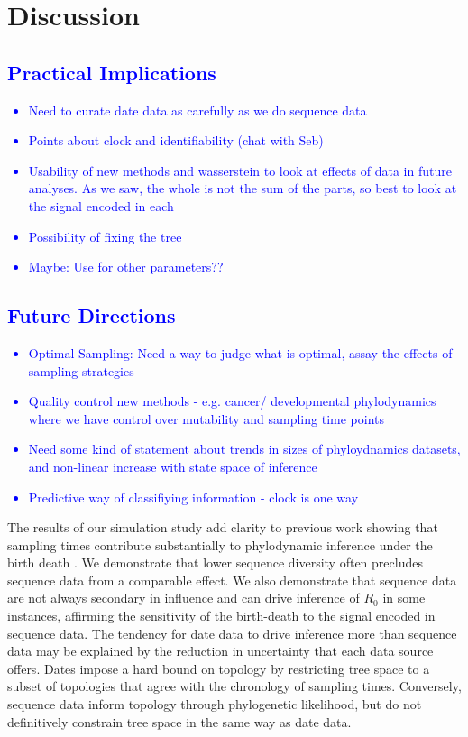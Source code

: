 \documentclass{article}
\begin{document}
\section*{Discussion}
\textcolor{blue}{\subsection{Practical Implications}
    \begin{itemize}
        \item Need to curate date data as carefully as we do sequence data
        \item Points about clock and identifiability (chat with Seb)
        \item Usability of new methods and wasserstein to look at effects of data in future analyses. As we saw, the whole is not the sum of the parts, so best to look at the signal encoded in each
        \item Possibility of fixing the tree
        \item Maybe: Use for other parameters??
    \end{itemize}
    }
    
\textcolor{blue}{\subsection{Future Directions}
    \begin{itemize}
        \item Optimal Sampling: Need a way to judge what is optimal, assay the effects of sampling strategies
        \item Quality control new methods - e.g. cancer/ developmental phylodynamics where we have control over mutability and sampling time points
        \item Need some kind of statement about trends in sizes of phyloydnamics datasets, and non-linear increase with state space of inference
        \item Predictive way of classifiying information - clock is one way
    \end{itemize}
    }
The results of our simulation study add clarity to previous work showing that sampling times contribute substantially to phylodynamic inference under the birth death \citep{volz_sampling_2014, Featherstone2021Infectious}. We demonstrate that lower sequence diversity often precludes sequence data from a comparable effect. We also demonstrate that sequence data are not always secondary in influence and can drive inference of $R_{0}$ in some instances, affirming the sensitivity of the birth-death to the signal encoded in sequence data. The tendency for date data to drive inference more than sequence data may be explained by the reduction in uncertainty that each data source offers. Dates impose a hard bound on topology by restricting tree space to a subset of topologies that agree with the chronology of sampling times. Conversely, sequence data inform topology through phylogenetic likelihood, but do not definitively constrain tree space in the same way as date data.
\end{document}
